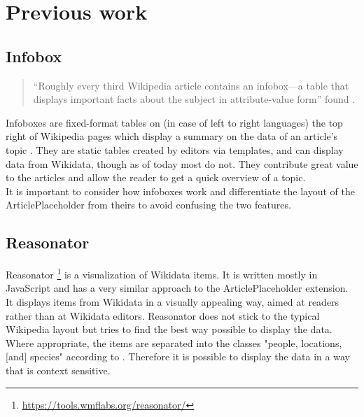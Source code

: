 \chapter{Previous work}
\section{Infobox} \label{infobox}
\begin{quote}
	``Roughly every third Wikipedia article contains an infobox---a table that displays important facts about the subject in attribute-value form'' found \citet[5]{infobox}.
\end{quote}
Infoboxes are fixed-format tables on (in case of left to right languages) the top right of Wikipedia pages which display a summary on the data of an article's topic \citep{wiki:05}. They are static tables created by editors via templates, and can display data from Wikidata, though as of today most do not. They contribute great value to the articles and allow the reader to get a quick overview of a topic. \\
It is important to consider how infoboxes work and differentiate the layout of the ArticlePlaceholder from theirs to avoid confusing the two features.

\section{Reasonator}
Reasonator \footnote{\url{https://tools.wmflabs.org/reasonator/}} is a visualization of Wikidata items. It is written mostly in JavaScript and has a very similar approach to the ArticlePlaceholder extension. It displays items from Wikidata in a visually appealing way, aimed at readers rather than at Wikidata editors. Reasonator does not stick to the typical Wikipedia layout but tries to find the best way possible to display the data. \\
Where appropriate, the items are separated into the classes  "people, locations, [and] species" according to \citet{wiki:06}. Therefore it is possible to display the data in a way that is context sensitive. \\

